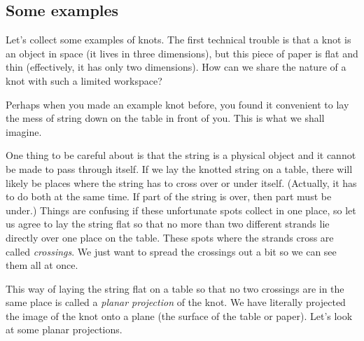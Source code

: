 \documentclass[12pt,letterpaper]{article}
\theoremstyle{definition}
\begin{document}
\subsection*{Some examples}

Let's collect some examples of knots. 
The first technical trouble is that a knot is an object in space (it lives in three dimensions), but this piece of paper is flat and thin  (effectively, it has only two dimensions).
How can we share the nature of a knot with such a limited workspace?

Perhaps when you made an example knot before, you found it convenient to lay the mess of string down on the table in front of you.
This is what we shall imagine.

One thing to be careful about is that the string is a physical object and it cannot be made to pass through itself.
If we lay the knotted string on a table, there will likely be places where the string has to cross over or under itself. 
(Actually, it has to do both at the same time. 
If part of the string is over, then part must be under.)
Things are confusing if these unfortunate spots collect in one place, so let us agree to lay the string flat so that no more than two different strands lie directly over one place on the table. 
These spots where the strands cross are called \emph{crossings}.
We just want to spread the crossings out a bit so we can see them all at once.

This way of laying the string flat on a table so that no two crossings are in the same place is called a \emph{planar projection} of the knot.
We have literally projected the image of the knot onto a plane (the surface of the table or paper). Let's look at some planar projections.
\end{document}

